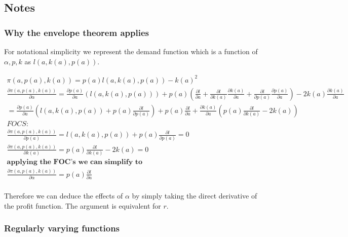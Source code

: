 \documentclass[12pt]{report}
\numberwithin{equation}{section}
\begin{document}
\subsection{Notes} \label{notes}

\subsubsection{Why the envelope theorem applies} \label{envelopetheorem}


For notational simplicity we represent the demand function which is a function of $\alpha, p, k$ as $l(a, k(a),p(a))$.  

\begin{align*}
\pi(a, p(a),k(a))= p(a) l(a, k(a),p(a))-k(a)^2 \\
\frac{ \partial \pi(a, p(a),k(a))}{\partial \alpha}= \frac{\partial p(a) }{\partial a } \left(
l(a, k(a),p(a)) \right)
+ p(a)\left( \frac{\partial l}{\partial a}
+\frac{\partial l}{\partial k(a)}\frac{\partial k(a)}{\partial a}
+\frac{\partial l}{\partial p(a)}\frac{\partial p(a)}{\partial a}
\right)
- 2 k(a) \frac{\partial k(a)}{\partial a}
\\ 
= \frac{\partial p(a) }{\partial a } \left(
l(a, k(a),p(a)) +p(a) \frac{\partial l}{\partial p(a)} \right)
+ p(a) \frac{\partial l}{\partial a}
+\frac{\partial k(a)}{\partial a}\left( p(a)\frac{\partial l}{\partial k(a)}-2 k(a)
 \right) \\
FOCS: 
\\
\frac{\partial \pi(a, p(a),k(a))}{\partial p(a)}=l(a, k(a),p(a))+p(a) \frac{\partial l}{\partial p(a)}=0 
\\
\frac{\partial \pi(a, p(a),k(a))}{\partial k(a)}=p(a) \frac{\partial l}{\partial k(a)} -2 k(a)=0
\\
\textbf{applying the FOC's we can simplify to}
\\
\frac{ \partial \pi(a, p(a),k(a))}{\partial \alpha}= 
p(a) \frac{\partial l}{\partial a} \\
\end{align*}

Therefore we can deduce the effects of $\alpha$ by simply taking the direct derivative of the profit function. The argument is equivalent for $r$.

\subsubsection{Regularly varying functions}
\end{document}

